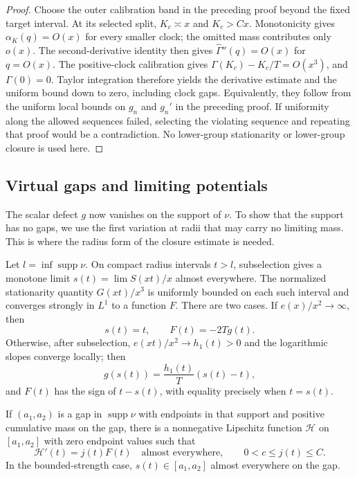 \begin{proof}
Choose the outer calibration band in the preceding proof beyond the
fixed target interval. At its selected split, $K_c\asymp x$ and
$K_c>Cx$. Monotonicity gives $\alpha_K(q)=O(x)$ for every smaller
clock; the omitted mass contributes only $o(x)$. The second-derivative
identity then gives $\widehat\Gamma''(q)=O(x)$ for $q=O(x)$.
The positive-clock calibration gives
$\Gamma(K_c)-K_c/T=O(x^3)$, and $\Gamma(0)=0$. Taylor integration
therefore yields the derivative estimate and the uniform bound down
to zero, including clock gaps. Equivalently, they follow from the
uniform local bounds on $g_n$ and $g_n'$ in the preceding proof.
If uniformity along the allowed sequences failed, selecting the
violating sequence and repeating that proof would be a contradiction.
No lower-group stationarity or lower-group closure is used here.
\end{proof}

\subsection{Virtual gaps and limiting potentials}

The scalar defect $g$ now vanishes on the support of $\nu$. To show
that the support has no gaps, we use the first variation at radii
that may carry no limiting mass. This is where the radius form of
the closure estimate is needed.

\begin{lemma}
\label{prof:virtual-potential}
Let $l=\inf\operatorname{supp}\nu$. On compact radius intervals
$t>l$, subselection gives a monotone limit
$s(t)=\lim S(xt)/x$ almost everywhere. The normalized stationarity
quantity $G(xt)/x^3$ is uniformly bounded on each such interval and
converges strongly in $L^1$ to a function $F$. There are two cases.
If $e(x)/x^2\to\infty$, then
\[
 s(t)=t,\qquad F(t)=-2Tg(t).
\]
Otherwise, after subselection, $e(xt)/x^2\to h_1(t)>0$ and the
logarithmic slopes converge locally; then
\[
 g(s(t))=\frac{h_1(t)}T(s(t)-t),
\]
and $F(t)$ has the sign of $t-s(t)$, with equality precisely when
$t=s(t)$.

If $(a_1,a_2)$ is a gap in $\operatorname{supp}\nu$ with endpoints
in that support and positive cumulative mass on the gap, there is
a nonnegative Lipschitz function $\mathcal H$ on $[a_1,a_2]$ with
zero endpoint values such that
\[
 \mathcal H'(t)=j(t)F(t)\quad\text{almost everywhere},
 \qquad 0<c\le j(t)\le C.
\]
In the bounded-strength case, $s(t)\in[a_1,a_2]$ almost everywhere
on the gap.
\end{lemma}

